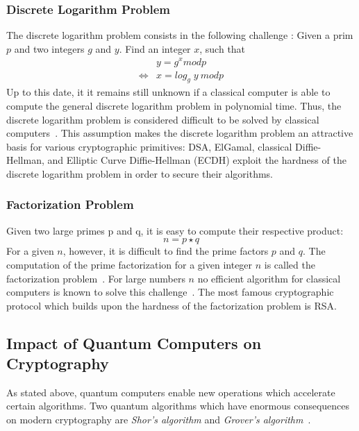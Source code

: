 \subsubsection{Discrete Logarithm Problem} \label{discrete_log_problem}
The discrete logarithm problem consists in the following challenge \parencite{beutelspacher2010diskrete}: Given a prim $p$ and two integers $g$ and $y$. Find an integer $x$, such that
\begin{equation*}
\begin{split}
&y = g^x mod p \\
\iff &x = log_g\;y\:mod p
\end{split}
\end{equation*}
Up to this date, it it remains still unknown if a classical computer is able to compute the general discrete logarithm problem in polynomial time. Thus, the discrete logarithm problem is considered difficult to be solved by classical computers~\parencite{beutelspacher2010diskrete}. This assumption makes the discrete logarithm problem an attractive basis for various cryptographic primitives: DSA, ElGamal, classical Diffie-Hellman, and Elliptic Curve Diffie-Hellman (\gls{ECDH}) exploit the hardness of the discrete logarithm problem in order to secure their algorithms.

\subsubsection{Factorization Problem} \label{factorization_problem}

Given two large primes p and q, it is easy to compute their respective product:
\begin{equation*}
n = p \star q
\end{equation*}
For a given $n$, however, it is difficult to find the prime factors $p$ and $q$. The computation of the prime factorization for a given integer $n$ is called the factorization problem~\parencite{ITSicherheit}. For large numbers $n$ no efficient algorithm for classical computers is known to solve this challenge~\parencite{ITSicherheit}. The most famous cryptographic protocol which builds upon the hardness of the factorization problem is \gls{RSA}.

\subsection{Impact of Quantum Computers on Cryptography}

As stated above, quantum computers enable new operations which accelerate certain algorithms. Two quantum algorithms which have enormous consequences on modern cryptography are \textit{Shor's algorithm} and \textit{Grover's algorithm}~\parencite{nielsen2002quantum}.

